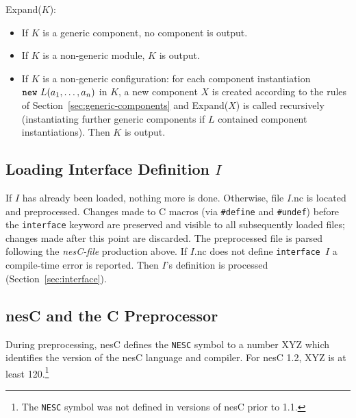 \documentclass[11pt,letterpaper]{article}
\newcommand{\kw}[1]{{\tt #1}}
\newcommand{\code}[1]{{\tt #1}}
\newcommand{\nesc}{nesC\xspace}
\begin{document}
Expand($K$):
\begin{itemize}
\item If $K$ is a generic component, no component is output.

\item If $K$ is a non-generic module, $K$ is output.

\item If $K$ is a non-generic configuration: for each component
instantiation $\kw{new}\ L(a_1, \ldots, a_n)$ in $K$, a new component $X$ is
created according to the rules of Section~\ref{sec:generic-components} and
Expand($X$) is called recursively (instantiating further generic components
if $L$ contained component instantiations). Then $K$ is output.
\end{itemize}

\subsection{Loading Interface Definition $I$}
\label{sec:load-intf}

If $I$ has already been loaded, nothing more is done. Otherwise, file
$I$.nc is located and preprocessed. Changes made to C macros (via
\code{\#define} and \code{\#undef}) before the \kw{interface} keyword are
preserved and visible to all subsequently loaded files; changes made after
this point are discarded. The preprocessed file is parsed following the
\emph{nesC-file} production above. If $I$.nc does not define
\code{interface $I$} a compile-time error is reported. Then
$I$'s definition is processed (Section~\ref{sec:interface}).

\subsection{\nesc and the C Preprocessor}
\label{sec:cpp}

During preprocessing, \nesc defines the \kw{NESC} symbol to a number XYZ
which identifies the version of the \nesc language and compiler.  For \nesc
1.2, XYZ is at least 120.\footnote{The \kw{NESC} symbol was not defined in
versions of \nesc prior to 1.1.}
\end{document}
